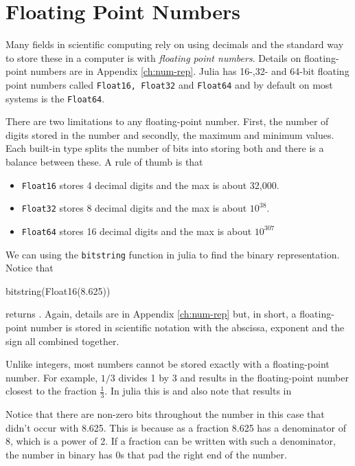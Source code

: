 \section{Floating Point Numbers}

Many fields in scientific computing rely on using decimals and the standard way to store these in a computer is with \emph{floating point numbers}.  Details on floating-point numbers are in Appendix \ref{ch:num-rep}. Julia has 16-,32- and 64-bit floating point numbers called \texttt{Float16, Float32} and \texttt{Float64} and by default on most systems is the \texttt{Float64}. 

There are two limitations to any floating-point number.  First, the number of digits stored in the number and secondly, the maximum and minimum values.  Each built-in type splits the number of bits into storing both and there is a balance between these.  A rule of thumb is that 
\begin{itemize}
\item \texttt{Float16} stores 4 decimal digits and the max is about 32,000.
\item \texttt{Float32} stores 8 decimal digits and the max is about $10^{38}$. 
\item \texttt{Float64} stores 16 decimal digits and the max is about $10^{307}$
\end{itemize}

We can using the \texttt{bitstring} function in julia to find the binary representation. Notice that
%
\begin{jlblock}[types]
bitstring(Float16(8.625))
\end{jlblock}
returns  \printpythontex[verb].
Again, details are in Appendix \ref{ch:num-rep} but, in short, a floating-point number is stored in scientific notation with the abscissa, exponent and the sign all combined together.  

Unlike integers, most numbers cannot be stored exactly with a floating-point number.  For example, $1/3$ divides 1 by 3 and results in the floating-point number closest to the fraction $\frac{1}{3}$.  In julia this is  \printpythontex and also note that  results in \printpythontex[verbatim]

Notice that there are non-zero bits throughout the number in this case that didn't occur with 8.625.  This is because as a fraction 8.625 has a denominator of 8, which is a power of 2.  If a fraction can be written with such a denominator, the number in binary has 0s that pad the right end of the number.  

